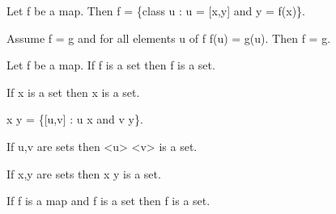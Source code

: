 \documentclass[a4paper,draft]{amsproc}
\begin{document}
\begin{forthel}
\begin{theorem}[70]
Let f be a map. Then f = \{class u : u = [x,y] and y = f(x)\}.
\end{theorem}

\begin{theorem}[71]
Assume \domain f = \domain g and for all elements u of \domain f
f(u) = g(u). Then f = g.
\end{theorem}

\begin{axiom}[V]
Let f be a map. If \domain f is a set then \range f is a set.
\end{axiom}

\begin{axiom}[VI]
If x is a set then \bigcup x is a set.
\end{axiom}

\begin{definition}[72]
 x \times y = \{[u,v] : u \in x and v \in y\}.
\end{definition}

\begin {theorem}[73]
If u,v are sets then <u> \times <v> is a set.
\end{theorem}

\begin{theorem}[74]
If x,y are sets then x \times y is a set.
\end{theorem}

\begin{theorem}[75]
If f is a map and \domain f is a set 
then f is a set.\end{theorem}


\end{forthel}
\end{document}
